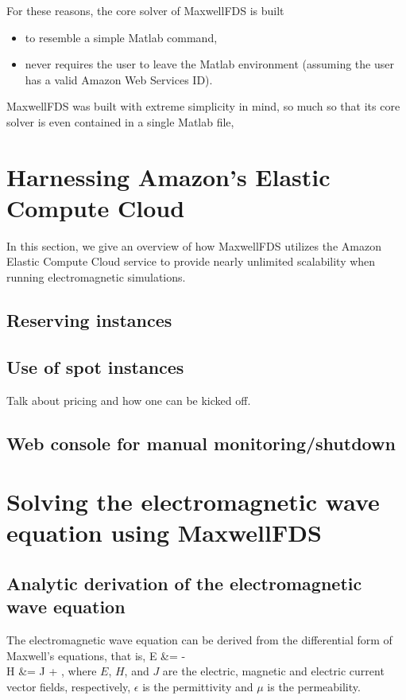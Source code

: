 \documentclass{article}
\newcommand{\MaxwellFDS}{MaxwellFDS }
\newcommand{\BI}{\begin{itemize}\item}
\newcommand{\EI}{\end{itemize}}
\newcommand{\I}{\item}
\begin{document}
For these reasons, the core solver of \MaxwellFDS is built
    \BI to resemble a simple Matlab command,
    \I  never requires the user to leave the Matlab environment
            (assuming the user has a valid Amazon Web Services ID). \EI

\MaxwellFDS was built with extreme simplicity in mind,
    so much so that its core solver is even contained in a single Matlab file,

\section{Harnessing Amazon's Elastic Compute Cloud} 
In this section, we give an overview of how \MaxwellFDS utilizes
    the Amazon Elastic Compute Cloud service to 
    provide nearly unlimited scalability when running electromagnetic simulations.

\subsection{Reserving instances}
\subsection{Use of spot instances}
Talk about pricing and how one can be kicked off.

\subsection{Web console for manual monitoring/shutdown}

\section{Solving the electromagnetic wave equation using \MaxwellFDS}
\subsection{Analytic derivation of the electromagnetic wave equation}
The electromagnetic wave equation can be derived from 
    the differential form of Maxwell's equations, that is,
    {\curl E &= - \mu {} \\
    \curl H &= J + \epsilon {}, }
    where $E$, $H$, and $J$ are 
    the electric, magnetic and electric current
    vector fields, respectively,
    $\epsilon$ is the permittivity
    and $\mu$ is the permeability.
\end{document}
